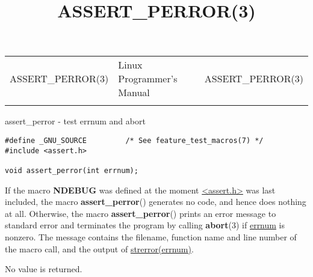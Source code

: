 \documentclass[]{article}
\title{ASSERT\_PERROR(3)}
\author{}
\date{}
\let\realtextbf=\textbf
\renewcommand{\textbf}[1]{\textcolor{boldcolor}{\realtextbf{#1}}}
\renewcommand{\emph}[1]{\underline{#1}}
\begin{document}
\maketitle

\begin{longtable}[c]{@{}lll@{}}
\toprule\addlinespace
ASSERT\_PERROR(3) & Linux Programmer's Manual & ASSERT\_PERROR(3)
\\\addlinespace
\bottomrule
\end{longtable}


assert\_perror - test errnum and abort


\begin{verbatim}
#define _GNU_SOURCE         /* See feature_test_macros(7) */
#include <assert.h>
 
void assert_perror(int errnum);
\end{verbatim}


If the macro \textbf{NDEBUG} was defined at the moment
\emph{\textless{}assert.h\textgreater{}} was last included, the macro
\textbf{assert\_perror}() generates no code, and hence does nothing at
all. Otherwise, the macro \textbf{assert\_perror}() prints an error
message to standard error and terminates the program by calling
\textbf{abort}(3) if \emph{errnum} is nonzero. The message contains the
filename, function name and line number of the macro call, and the
output of \emph{strerror(errnum)}.


No value is returned.
\end{document}
